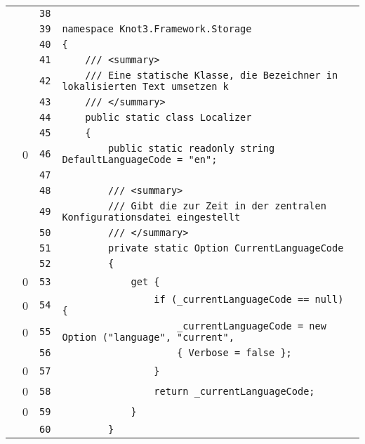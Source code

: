 \documentclass[a4paper,10pt]{article}
\begin{document}
\begin{longtable}[l]{lrrl}
\cellcolor{gray} &  & \verb~38~ & \verb~~\\
\cellcolor{gray} &  & \verb~39~ & \verb~namespace Knot3.Framework.Storage~\\
\cellcolor{gray} &  & \verb~40~ & \verb~{~\\
\cellcolor{gray} &  & \verb~41~ & \verb~    /// <summary>~\\
\cellcolor{gray} &  & \verb~42~ & \verb~    /// Eine statische Klasse, die Bezeichner in lokalisierten Text umsetzen k~\\
\cellcolor{gray} &  & \verb~43~ & \verb~    /// </summary>~\\
\cellcolor{gray} &  & \verb~44~ & \verb~    public static class Localizer~\\
\cellcolor{gray} &  & \verb~45~ & \verb~    {~\\
\cellcolor{red} & 0 & \verb~46~ & \verb~        public static readonly string DefaultLanguageCode = "en";~\\
\cellcolor{gray} &  & \verb~47~ & \verb~~\\
\cellcolor{gray} &  & \verb~48~ & \verb~        /// <summary>~\\
\cellcolor{gray} &  & \verb~49~ & \verb~        /// Gibt die zur Zeit in der zentralen Konfigurationsdatei eingestellt~\\
\cellcolor{gray} &  & \verb~50~ & \verb~        /// </summary>~\\
\cellcolor{gray} &  & \verb~51~ & \verb~        private static Option CurrentLanguageCode~\\
\cellcolor{gray} &  & \verb~52~ & \verb~        {~\\
\cellcolor{red} & 0 & \verb~53~ & \verb~            get {~\\
\cellcolor{red} & 0 & \verb~54~ & \verb~                if (_currentLanguageCode == null) {~\\
\cellcolor{red} & 0 & \verb~55~ & \verb~                    _currentLanguageCode = new Option ("language", "current", ~\\
\cellcolor{gray} &  & \verb~56~ & \verb~                    { Verbose = false };~\\
\cellcolor{red} & 0 & \verb~57~ & \verb~                }~\\
\cellcolor{red} & 0 & \verb~58~ & \verb~                return _currentLanguageCode;~\\
\cellcolor{red} & 0 & \verb~59~ & \verb~            }~\\
\cellcolor{gray} &  & \verb~60~ & \verb~        }~\\

\end{longtable}
\end{document}
